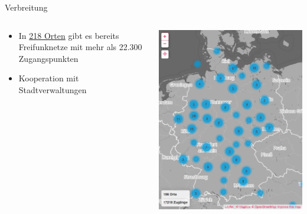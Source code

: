 \documentclass[t]{beamer}
\begin{document}
  \begin{frame}{Verbreitung}
    \begin{columns}
      \begin{column}{0.6\textwidth}
	\begin{itemize}
	  \item In  \href{http://freifunk.net/wie-mache-ich-mit/community-finden/}{218 Orten} gibt es bereits Freifunknetze mit mehr als 22.300 Zugangspunkten
	  \item Kooperation mit Stadtverwaltungen
	\end{itemize}
      \end{column}
      \begin{column}{0.4\textwidth}
	\begin{center}
	  \includegraphics[width=\textwidth]{Bilder/community-map-2015-08-13}
	\end{center}
      \end{column}
    \end{columns}
  \end{frame}
  
\end{document}

